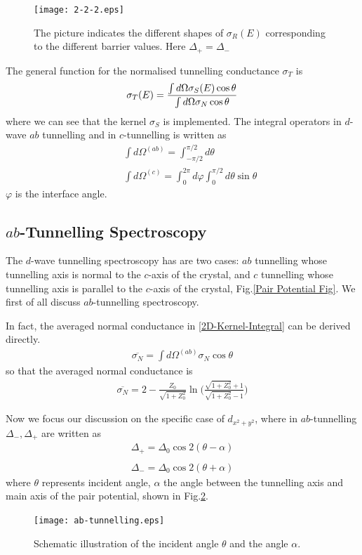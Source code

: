 \begin{figure}[htbp]
\small
\centering
\texttt{[image: 2-2-2.eps]}
\caption{The picture indicates the different shapes of $\sigma_R(E)$ corresponding to the different barrier values. Here $\Delta_+=\Delta_-$}
\label{fig:Kernel Vary Z}
\end{figure}

The general function for the normalised tunnelling conductance $\sigma_T$ is 
\begin{eqnarray}\label{2D-Kernel-Integral}
\sigma_T(E)=\DF{\int d\Omega \sigma_S(E)\cos\theta}{\int d\Omega\sigma_N\cos\theta}
\end{eqnarray}
where we can see that the kernel $\sigma_S$ is implemented.
The integral operators in $d$-wave $ab$ tunnelling and in $c$-tunnelling is written as
\begin{eqnarray}\label{abc}
&&\int d\Omega^{(ab)}=\int_{-\pi/2}^{\pi/2} d\theta\nonumber\\
&&\int d\Omega^{(c)}=\int_{0}^{2\pi}d\varphi\int_{0}^{\pi/2} d\theta \sin\theta
\end{eqnarray}
$\varphi$ is the interface angle.

\subsection{$ab$-Tunnelling Spectroscopy}
The $d$-wave tunnelling spectroscopy has are two cases: $ab$ tunnelling whose tunnelling axis is normal to the $c$-axis of the crystal, and $c$ tunnelling whose tunnelling axis is parallel to the $c$-axis of the crystal, Fig.\ref{Pair Potential Fig}. We first of all discuss $ab$-tunnelling spectroscopy.

In fact, the averaged normal conductance in \eqref{2D-Kernel-Integral} can be derived directly.
\begin{eqnarray}
\overline{\sigma_N}=\int d\Omega^{(ab)} \sigma_N\cos\theta
\end{eqnarray}
so that
the averaged normal conductance is
\begin{eqnarray}
\overline{\sigma_N}=2-\frac{Z_0}{\sqrt{1+Z_0^2}}\ln\Big(\frac{\sqrt{1+Z_0^2}+1}{\sqrt{1+Z_0^2}-1}\Big)
\end{eqnarray}

Now we focus our discussion on the specific case of $d_{x^2+y^2}$, where in $ab$-tunnelling $\Delta_-,\Delta_+$ are written as
\begin{eqnarray}\label{ab pair potential}
\Delta_+=\Delta_0\cos2(\theta-\alpha)\nonumber\\
\\
\Delta_-=\Delta_0\cos2(\theta+\alpha)\nonumber
\end{eqnarray}
where $\theta$ represents incident angle, $\alpha$ the angle between the tunnelling axis and main axis of the pair potential, shown in Fig.\ref{fig:ab-tunnelling schematic}.
\begin{figure}[htbp]
\small
\centering
\texttt{[image: ab-tunnelling.eps]}
\caption{Schematic illustration of the incident angle $\theta$ and the angle $\alpha$.}
\label{fig:ab-tunnelling schematic}
\end{figure}


